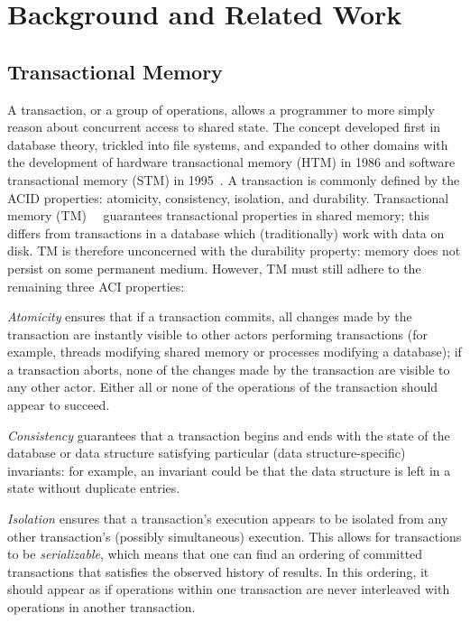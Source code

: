 \chapter{Background and Related Work}
\label{related_work}

\section{Transactional Memory}
A transaction, or a group of operations, allows a programmer to more simply reason about concurrent access to shared state. The concept developed first in database theory, trickled into file systems, and expanded to other domains with the development of hardware transactional memory (HTM) in 1986 and software transactional memory (STM) in 1995~\cite{harristm}. 
A transaction is commonly defined by the ACID properties: atomicity, consistency, isolation, and durability. Transactional memory (TM)~\cite{harristm}~\cite{herlihytm} guarantees transactional properties in shared memory; this differs from transactions in a database which (traditionally) work with data on disk.
TM is therefore unconcerned with the durability property: memory does not persist on some permanent medium. However, TM must still adhere to the remaining three ACI properties:

\emph{Atomicity} ensures that if a transaction commits, all changes made by the transaction are instantly visible to other actors performing transactions (for example, threads modifying shared memory or processes modifying a database); if a transaction aborts, none of the changes made by the transaction are visible to any other actor. Either all or none of the operations of the transaction should appear to succeed.

\emph{Consistency} guarantees that a transaction begins and ends with the state of the database or data structure satisfying particular (data structure-specific) invariants: for example, an invariant could be that the data structure is left in a state without duplicate entries.

\emph{Isolation} ensures that a transaction's execution appears to be isolated from any other transaction's (possibly simultaneous) execution. This allows for transactions to be \emph{serializable}, which means that one can find an ordering of committed transactions that satisfies the observed history of results. In this ordering, it should appear as if operations within one transaction are never interleaved with operations in another transaction. 

